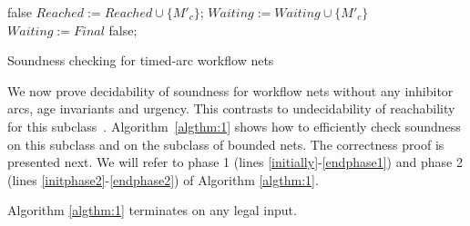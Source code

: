 \begin{algorithm}[h!]
{{{{{
{\Return false\;} 
$\mathit{Reached}:= \mathit{Reached} \cup \{M'_c\}$;  $\mathit{Waiting}:= \mathit{Waiting} \cup \{M'_c\}$\; 
}
}
}
}
$\mathit{Waiting}:= \mathit{Final}$\; 
{\Return false;} 
}
\caption{Soundness checking for timed-arc workflow nets\label{algthm:1}}
\end{algorithm}

We now prove decidability of soundness for workflow nets without 
any inhibitor arcs, age invariants and urgency. This contrasts to
undecidability of reachability 
for this subclass~\cite{RGE:reachability}. 
Algorithm~\ref{algthm:1} shows how to efficiently check soundness
on this subclass and on the subclass of bounded nets.
The correctness proof is presented next. We will refer 
to phase 1 (lines \ref{initially}-\ref{endphase1}) 
and phase 2 (lines \ref{initphase2}-\ref{endphase2}) of Algorithm \ref{algthm:1}.

\begin{lemma}[Termination]
	\label{algthm:1:termination}
	Algorithm \ref{algthm:1} terminates on any legal input.
\end{lemma}

